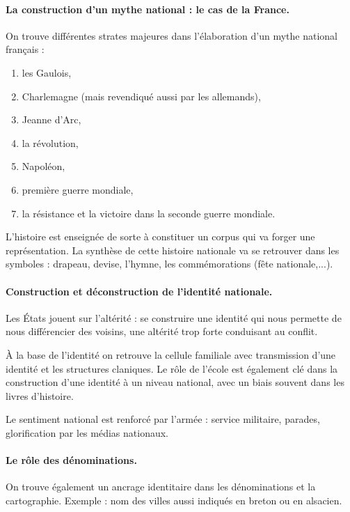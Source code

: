 \documentclass[a4paper,10pt]{article}
\begin{document}
		\paragraph{La construction d'un mythe national : le cas de la France.}

		On trouve différentes strates majeures dans l'élaboration d'un mythe national français :
		\begin{enumerate}
		\item les Gaulois,
		\item Charlemagne (mais revendiqué aussi par les allemands),
		\item Jeanne d'Arc,
		\item la révolution,
		\item Napoléon,
		\item première guerre mondiale,
		\item la résistance et la victoire dans la seconde guerre mondiale.
		\end{enumerate}

		L'histoire est enseignée de sorte à constituer un corpus qui va forger une représentation.
		La synthèse de cette histoire nationale va se retrouver dans les symboles : drapeau, devise, l'hymne, les commémorations (fête nationale,...).

		\paragraph{Construction et déconstruction de l'identité nationale.}

		Les États jouent sur l'altérité : se construire une identité qui nous permette de nous différencier des voisins, une altérité trop forte conduisant au conflit.

		À la base de l'identité on retrouve la cellule familiale avec transmission d'une identité et les structures claniques.
		Le rôle de l'école est également clé dans la construction d'une identité à un niveau national, avec un biais souvent dans les livres d'histoire.

		Le sentiment national est renforcé par l'armée : service militaire, parades, glorification par les médias nationaux.

		\paragraph{Le rôle des dénominations.}

		On trouve également un ancrage identitaire dans les dénominations et la cartographie.
		Exemple : nom des villes aussi indiqués en breton ou en alsacien.
\end{document}
